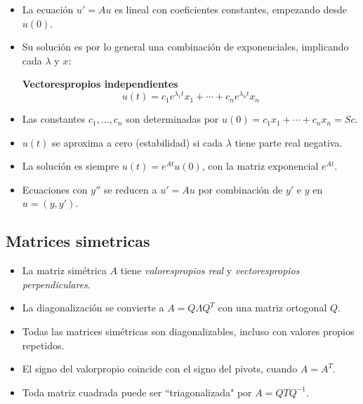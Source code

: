 \documentclass[]{article}
\begin{document}
\begin{itemize}
	
	\item La ecuaci\'on $ u'=Au $ es lineal con coeficientes constantes, empezando desde $ u(0) $. 
	
	\item Su soluci\'on es por lo general una combinaci\'on de exponenciales, implicando cada $ \lambda $ y $ x $: 
	
	\textbf{Vectorespropios independientes}
	\[
	u(t)=c_{1}e^{\lambda_{1}t}x_{1}+\cdots+c_{n}e^{\lambda_{n}t}x_{n}
	\]
	
	\item Las constantes $ c_{1},...,c_{n} $ son determinadas por $ u(0)=c_{1}x_{1}+\cdots+c_{n}x_{n}=Sc $.
	
	\item $ u(t) $ se aproxima a cero (estabilidad) si cada $ \lambda $ tiene parte real negativa. 
	
	\item La soluci\'on es siempre $ u(t)=e^{At}u(0) $, con la matriz exponencial $ e^{At} $. 
	
	\item Ecuaciones con $ y'' $ se reducen a $ u'=Au $ por combinaci\'on de $ y' $ e $ y $ en $ u=(y,y') $.  
	
\end{itemize}

\subsection{Matrices simetricas}

\begin{itemize}

	\item La matriz sim\'etrica $ A $ tiene \textit{valorespropios real} y \textit{vectorespropios perpendiculares}.
	
	\item La diagonalizaci\'on se convierte a $ A=Q\Lambda Q^{T} $ con una matriz ortogonal $ Q $. 
	
	\item Todas las matrices sim\'etricas son diagonalizables, incluso con valores propios repetidos. 
	
	\item El signo del valorpropio coincide con el signo del pivots, cuando $ A=A^{T} $.  
	
	\item Toda matriz cuadrada puede ser ``triagonalizada" por $ A=QTQ^{-1} $. 
	
\end{itemize}
\end{document}
